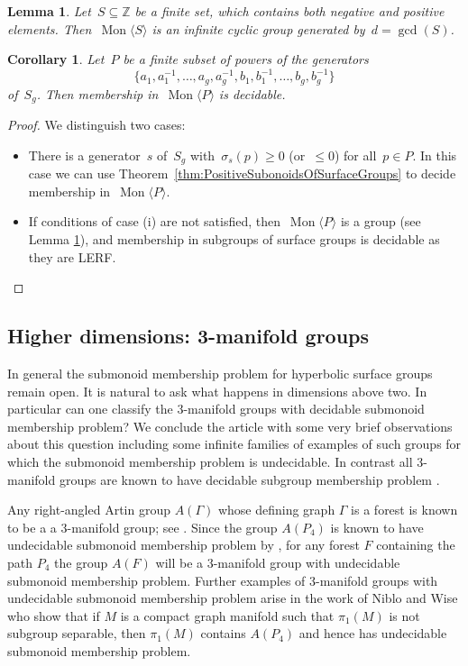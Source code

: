 \documentclass[11pt]{amsart}
\newcommand{\Mgen}[1]{\operatorname{Mon}\bigl\langle #1 \bigr\rangle}
\newcommand{\Z}{\mathbb{Z}}
\theoremstyle{plain}
\newtheorem{lemma}[theorem]{Lemma}
\newtheorem{cor}[theorem]{Corollary}
\theoremstyle{definition}
\begin{document}
\begin{lemma}\label{lem: when monoids are groups}
Let~$S \subseteq \Z$ be a finite set, which contains both negative and positive elements. Then~$\Mgen{S}$ is an infinite cyclic group generated by~$d = \gcd(S)$.
\end{lemma}

\begin{cor}\label{cor:powers}
    Let~$P$ be a finite subset of powers of the generators 
    \[ \{a_1, a_1^{-1}, \ldots, a_g, a_g^{-1}, b_1, b_1^{-1}, \ldots, b_g, b_g^{-1} \} \]  
    of~$S_g$. Then membership in~$\Mgen{P}$ is decidable. 
\end{cor}
\begin{proof} We distinguish two cases:
\begin{itemize}
    \item[(i)] There is a generator~$s$ of~$S_g$ with~$\sigma_s(p) \geq 0$ (or~$\leq 0$) for all~$p \in P$. In this case we can use Theorem~\ref{thm:PositiveSubonoidsOfSurfaceGroups} to decide membership in~$\Mgen{P}$.
    \item[(ii)] If conditions of case (i) are not satisfied, then~$\Mgen{P}$ is a group (see Lemma \ref{lem: when monoids are groups}), and membership in subgroups of surface groups is decidable as they are LERF.
\end{itemize}
 \end{proof}

\subsection{Higher dimensions: 3-manifold groups}\label{sec:HighDim}
In general the submonoid membership problem for hyperbolic surface groups remain open. 
It is natural to ask what happens in dimensions above two. 
In particular can one classify the 3-manifold groups with decidable submonoid membership problem? 
We conclude the article with some very brief observations about this question including some infinite families of examples of such groups for which the submonoid membership problem is undecidable. 
In contrast all 3-manifold groups are known to have decidable subgroup membership problem \cite{friedl2016membership}.



Any right-angled Artin group $A(\Gamma)$ whose defining graph $\Gamma$ 
is a forest 
is known to be a 
a $3$-manifold group; see \cite{droms1987graph}.
Since the group $A(P_4)$ is known to have undecidable submonoid membership problem by \cite{lohrey2008submonoid}, for any forest $F$ containing the path $P_4$ the group $A(F)$ will be a $3$-manifold group with undecidable submonoid membership problem.
Further examples of 3-manifold groups with undecidable submonoid membership problem arise in the work of Niblo and Wise \cite{niblo2001} who show that if $M$ is a compact graph manifold such that $\pi_1(M)$ is not subgroup separable, then $\pi_1(M)$ contains $A(P_4)$ and hence has undecidable submonoid membership problem. 
\end{document}
